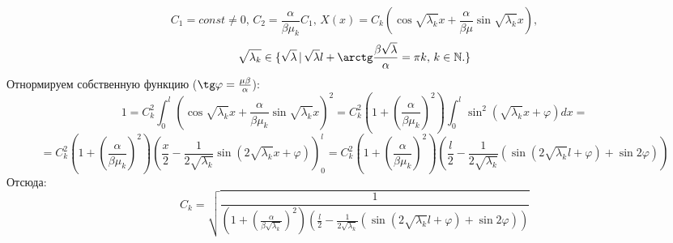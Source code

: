 \documentclass[12pt, a4paper]{report}
\begin{document}
\[ C_{1} = const \ne 0, \, C_{2} = \frac{\alpha}{\beta \mu_{k}} C_{1}, \, X(x) = C_{k} (\cos \sqrt{\lambda_{k}} x + \frac{\alpha}{\beta \mu} \sin \sqrt{\lambda_{k}} x), \]
\[ \sqrt{\lambda_{k}} \in \{ \sqrt{\lambda} \, | \, \sqrt{\lambda} l + \arctg \frac{\beta \sqrt{\lambda}}{\alpha} = \pi k, \, k \in \mathbb{N}. \} \]
Отнормируем собственную функцию ($\tg \varphi = \frac{\mu \beta}{\alpha}$):
\[ 1 = C_{k}^2 \int_{0}^{l} (\cos \sqrt{\lambda_{k}} x + \frac{\alpha}{\beta \mu_{k}} \sin \sqrt{\lambda_{k}} x)^2 = C_{k}^2 (1 + (\frac{\alpha}{\beta \mu_{k}})^2) \int_{0}^{l} \sin^2 (\sqrt{\lambda_{k}}x + \varphi) dx = \]
\[ = C_{k}^2 (1 + (\frac{\alpha}{\beta \mu_{k}})^2) (\frac{x}{2} - \frac{1}{2\sqrt{\lambda_{k}}} \sin (2\sqrt{\lambda_{k}}x + \varphi))_{0}^{l} = C_{k}^2 (1 + (\frac{\alpha}{\beta \mu_{k}})^2) (\frac{l}{2} - \frac{1}{2\sqrt{\lambda_{k}}} (\sin (2\sqrt{\lambda_{k}}l + \varphi) + \sin 2\varphi))\]
Отсюда:
\[ C_{k} = \sqrt{\frac{1}{(1 + (\frac{\alpha}{\beta \sqrt{\lambda_{k}}})^2) (\frac{l}{2} - \frac{1}{2\sqrt{\lambda_{k}}} (\sin (2\sqrt{\lambda_{k}}l + \varphi) + \sin 2\varphi))}} \]
\end{document}
